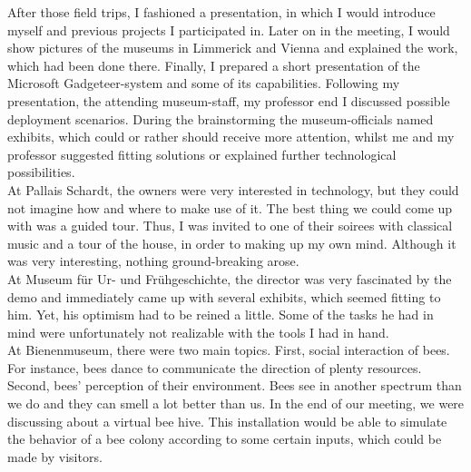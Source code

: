 After those field trips, I fashioned a presentation, in which I would introduce myself and previous projects I participated in. Later on in the meeting, I would show pictures of the museums in Limmerick and Vienna and explained the work, which had been done there. Finally, I prepared a short presentation of the Microsoft Gadgeteer-system and some of its capabilities. Following my presentation, the attending museum-staff, my professor end I discussed possible deployment scenarios. During the brainstorming the museum-officials named exhibits, which could or rather should receive more attention, whilst me and my professor suggested fitting solutions or explained further technological possibilities.
\\
At Pallais Schardt, the owners were very interested in technology, but they could not imagine how and where to make use of it. The best thing we could come up with was a guided tour. Thus, I was invited to one of their soirees with classical music and a tour of the house, in order to making up my own mind. Although it was very interesting, nothing ground-breaking arose.
\\
At Museum für Ur- und Frühgeschichte, the director was very fascinated by the demo and immediately came up with several exhibits, which seemed fitting to him. Yet, his optimism had to be reined a little. Some of the tasks he had in mind were unfortunately not realizable with the tools I had in hand.
\\
At Bienenmuseum, there were two main topics. First, social interaction of bees. For instance, bees dance to communicate the direction of plenty resources. Second, bees' perception of their environment. Bees see in another spectrum than we do and they can smell a lot better than us. In the end of our meeting, we were discussing about a virtual bee hive. This installation would be able
to simulate the behavior of a bee colony according to some certain inputs, which could be made by visitors.
\\
